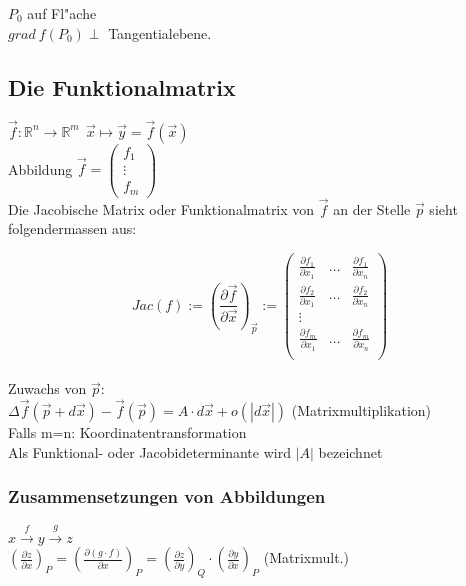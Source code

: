 \documentclass[10pt, a4paper, twocolumn]{scrartcl}
\begin{document}
$P_0$ auf Fl"ache\\
$grad\:f(P_0)\perp$ Tangentialebene.


\subsection{Die Funktionalmatrix}

$\vec{f}:\mathbb{R}^n\rightarrow \mathbb{R}^m\:\:\vec{x}\mapsto \vec{y}=\vec{f}(\vec{x})$\\
Abbildung $\vec{f}=
\left(
\begin{array}{c}
 f_1\\
 \vdots\\
 f_m
\end{array}
\right )$\\

Die Jacobische Matrix oder Funktionalmatrix von $\vec{f}$ an der Stelle $\vec{p}$ sieht folgendermassen aus:

$$
Jac(f):=(\frac{\partial \vec{f}}{\partial \vec{x}})_{\vec{p}}:=
\left (
\begin{array}{ccc}
 \frac{\partial f_1}{\partial x_1} &	\ldots &	\frac{\partial f_1}{\partial x_n}\\
 \frac{\partial f_2}{\partial x_1} &	\ldots &	\frac{\partial f_2}{\partial x_n}\\
 \vdots &				&		\\
 \frac{\partial f_m}{\partial x_1} &	\ldots &	\frac{\partial f_m}{\partial x_n}\\
\end{array}
\right )
$$\\

Zuwachs von $\vec{p}$:\\
$\Delta\vec{f}(\vec{p}+d\vec{x})-\vec{f}(\vec{p})=A\cdotp d\vec{x}+o(|d\vec{x}|)$ (Matrixmultiplikation)\\
Falls m=n: Koordinatentransformation\\

Als Funktional- oder Jacobideterminante wird $|A|$ bezeichnet

\subsubsection{Zusammensetzungen von Abbildungen}

$x\stackrel{f}{\rightarrow}y\stackrel{g}{\rightarrow}z$\\

$(\frac{\partial z}{\partial x})_P=(\frac{\partial(g\cdotp f)}{\partial x})_P=(\frac{\partial z}{\partial y})_Q\cdotp(\frac{\partial y}{\partial x})_P$ (Matrixmult.)
\end{document}

